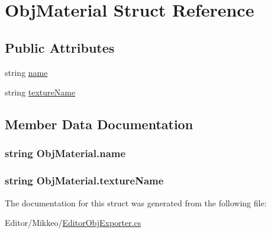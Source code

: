 \hypertarget{struct_obj_material}{}\section{Obj\+Material Struct Reference}
\label{struct_obj_material}
\subsection*{Public Attributes}
\begin{DoxyCompactItemize}
\item 
string \hyperlink{struct_obj_material_abbbca22d914ee485f965ba2c85d1de6e}{name}
\item 
string \hyperlink{struct_obj_material_aeffff97cdaf60fbf17cecec921b5fe56}{texture\+Name}
\end{DoxyCompactItemize}


\subsection{Member Data Documentation}
\subsubsection[{\texorpdfstring{name}{name}}]{\setlength{\rightskip}{0pt plus 5cm}string Obj\+Material.\+name}\hypertarget{struct_obj_material_abbbca22d914ee485f965ba2c85d1de6e}{}\label{struct_obj_material_abbbca22d914ee485f965ba2c85d1de6e}
\subsubsection[{\texorpdfstring{texture\+Name}{textureName}}]{\setlength{\rightskip}{0pt plus 5cm}string Obj\+Material.\+texture\+Name}\hypertarget{struct_obj_material_aeffff97cdaf60fbf17cecec921b5fe56}{}\label{struct_obj_material_aeffff97cdaf60fbf17cecec921b5fe56}


The documentation for this struct was generated from the following file\+:\begin{DoxyCompactItemize}
\item 
Editor/\+Mikkeo/\hyperlink{_editor_obj_exporter_8cs}{Editor\+Obj\+Exporter.\+cs}\end{DoxyCompactItemize}
